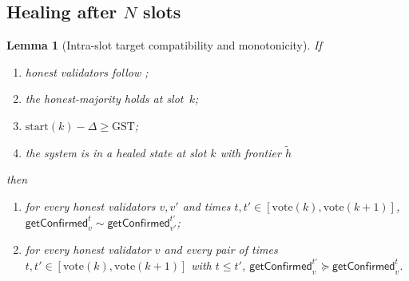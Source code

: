 \documentclass{article}
\newcommand{\start}{\ensuremath{\mathrm{start}}}
\newcommand{\vote}{\ensuremath{\mathrm{vote}}}
\newcommand{\GST}{\ensuremath{\mathrm{GST}}\xspace}
\newcommand{\comm}[1]{\ensuremath{\widetilde{#1}}}
\newcommand{\getConfirmed}{\textsf{getConfirmed}\xspace}
\theoremstyle{plain}
\newtheorem{lemma}{Lemma}
\theoremstyle{definition}
\theoremstyle{remark}
\begin{document}
\subsection{Healing after $N$ slots}

\iffalse
\begin{lemma}[Intra-slot target compatibility and monotonicity]\label{rev:lem:intra-slot-target-compat-monotone}
If
\begin{enumerate}
  \item\label{rev:istcm:f} honest validators follow ;
  \item\label{rev:istcm:ohm} the honest-majority holds at slot~$k$;
  \item\label{rev:istcm:sync} $\start(k) - \Delta \geq \GST$;
  \item\label{rev:istcm:hs} the system is in a healed state at slot $k$ with frontier $\comm{h}$
\end{enumerate}
then
\begin{enumerate}
  \item for every honest validators $v, v'$ and times $t, t' \in [\vote(k), \vote(k+1)]$, $\getConfirmed_v^t \sim \getConfirmed_{v'}^{t'}$;
  \item for every honest validator $v$ and every pair of times $t, t' \in [\vote(k), \vote(k+1)]$ with $t \leq t'$, $\getConfirmed_v^{t'} \succeq \getConfirmed_v^t$.
\end{enumerate}
\end{lemma}
\end{document}
